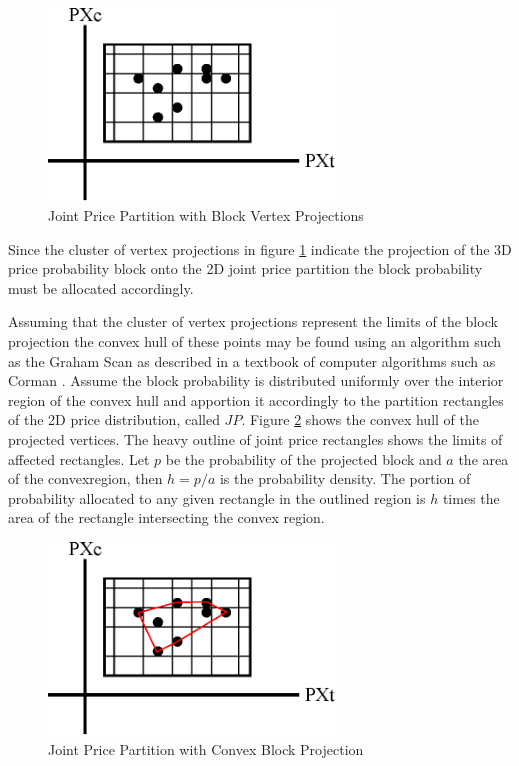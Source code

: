 \begin{figure}
  \centering
  \includegraphics[width=3in]{Images/ptc_rectangle}
  \caption[Joint Price Partition with Block Vertex Projections]
          {Joint Price Partition with Block Vertex Projections}
  \label{fig:ptc_rectangle}
\end{figure}

Since the cluster of vertex projections in figure \ref{fig:ptc_rectangle} indicate the projection of the 3D price probability block onto the 2D joint price partition the block probability must be allocated accordingly. 

Assuming that the cluster of vertex projections represent the limits of the block projection the convex hull of these points may be found using an algorithm such as the Graham Scan as described in a textbook of computer algorithms such as Corman \cite{corman09}. Assume the block probability is distributed uniformly over the interior region of the convex hull and apportion it accordingly to the partition rectangles of the 2D price distribution, called $JP$. Figure \ref{fig:ptc_rectangle_convex} shows the convex hull of the projected vertices. The heavy outline of joint price rectangles shows the limits of affected rectangles. Let $p$ be the probability of the projected block and $a$ the area of the convexregion, then $h = p/a$ is the probability density. The portion of probability allocated to any given rectangle in the outlined region is $h$ times the area of the rectangle intersecting the convex region.

\begin{figure}
  \centering
  \includegraphics[width=3in]{Images/ptc_rectangle_convex}
  \caption[Joint Price Partition with Convex Block Projection]
          {Joint Price Partition with Convex Block Projection}
  \label{fig:ptc_rectangle_convex}
\end{figure}

